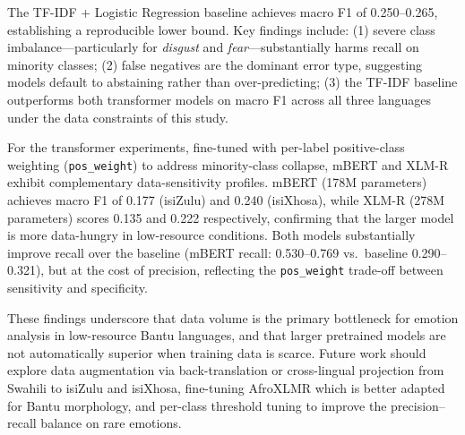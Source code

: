 \documentclass[11pt]{article}
\begin{document}
The TF-IDF + Logistic Regression baseline achieves macro F1 of 0.250--0.265,
establishing a reproducible lower bound.
Key findings include: (1) severe class imbalance---particularly for
\textit{disgust} and \textit{fear}---substantially harms recall on minority
classes; (2) false negatives are the dominant error type, suggesting
models default to abstaining rather than over-predicting;
(3) the TF-IDF baseline outperforms both transformer models on macro F1
across all three languages under the data constraints of this study.

For the transformer experiments, fine-tuned with per-label positive-class
weighting (\texttt{pos\_weight}) to address minority-class collapse, mBERT and
XLM-R exhibit complementary data-sensitivity profiles.
mBERT (178M parameters) achieves macro F1 of 0.177 (isiZulu) and 0.240
(isiXhosa), while XLM-R (278M parameters) scores 0.135 and 0.222 respectively,
confirming that the larger model is more data-hungry in low-resource conditions.
Both models substantially improve recall over the baseline (mBERT recall: 0.530--0.769
vs.\ baseline 0.290--0.321), but at the cost of precision, reflecting the
\texttt{pos\_weight} trade-off between sensitivity and specificity.

These findings underscore that data volume is the primary bottleneck for
emotion analysis in low-resource Bantu languages, and that larger pretrained
models are not automatically superior when training data is scarce.
Future work should explore data augmentation via back-translation or
cross-lingual projection from Swahili to isiZulu and isiXhosa,
fine-tuning AfroXLMR \citep{alabi2022adapting} which is better adapted
for Bantu morphology, and per-class threshold tuning to improve the
precision--recall balance on rare emotions.


\end{document}
